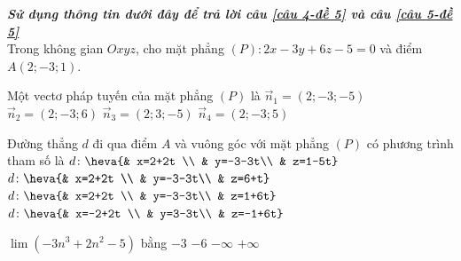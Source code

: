 \textbf{\textit{Sử dụng thông tin dưới đây để trả lời câu \ref{câu 4-đề 5} và câu \ref{câu 5-đề 5}}}\\[0.5em]
Trong không gian $Oxyz$, cho mặt phẳng $(P)\colon 2x-3y+6z-5=0$ và điểm $A(2;-3;1)$.
\begin{ex}%
	\label{câu 4-đề 5}
	Một vectơ pháp tuyến của mặt phẳng $(P)$ là
	\choice
	{$\overrightarrow{n}_1=(2;-3;-5)$}
	{\True $\overrightarrow{n}_2=(2;-3;6)$}
	{$\overrightarrow{n}_3=(2;3;-5)$}
	{$\overrightarrow{n}_4=(2;-3;5)$}
\end{ex}
\begin{ex}%
	\label{câu 5-đề 5}
	Đường thẳng $d$ đi qua điểm $A$ và vuông góc với mặt phẳng $(P)$ có phương trình tham số là
	\choice
	{$d\colon\heva{& x=2+2t \\ & y=-3-3t\\ & z=1-5t}$}
	{$d\colon\heva{& x=2+2t \\ & y=-3-3t\\ & z=6+t}$}
	{\True $d\colon\heva{& x=2+2t \\ & y=-3-3t\\ & z=1+6t}$}
	{$d\colon\heva{& x=-2+2t \\ & y=3-3t\\ & z=-1+6t}$}
\end{ex}
\begin{ex}%
	$\lim\left(-3n^3+2n^2-5\right)$ bằng
	\choice
	{$-3$}
	{$-6$}
	{\True $-\infty$}
	{$+\infty$}
\end{ex}
